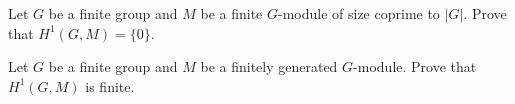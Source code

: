 \begin{exercise}
    Let $G$ be a finite group and 
    $M$ be a finite $G$-module of size coprime to $|G|$. Prove that 
    $H^1(G,M)=\{0\}$. 
\end{exercise}

\begin{exercise}
    Let $G$ be a finite group and 
    $M$ be a finitely generated $G$-module. Prove that
    $H^1(G,M)$ is finite.
\end{exercise}